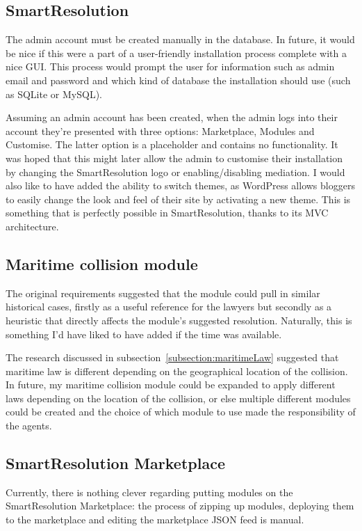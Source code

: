 \subsection{SmartResolution}

The admin account must be created manually in the database. In future, it would be nice if this were a part of a user-friendly installation process complete with a nice GUI. This process would prompt the user for information such as admin email and password and which kind of database the installation should use (such as SQLite or MySQL).

Assuming an admin account has been created, when the admin logs into their account they're presented with three options: Marketplace, Modules and Customise. The latter option is a placeholder and contains no functionality. It was hoped that this might later allow the admin to customise their installation by changing the SmartResolution logo or enabling/disabling mediation. I would also like to have added the ability to switch themes, as WordPress allows bloggers to easily change the look and feel of their site by activating a new theme. This is something that is perfectly possible in SmartResolution, thanks to its MVC architecture.

\subsection{Maritime collision module}

The original requirements suggested that the module could pull in similar historical cases, firstly as a useful reference for the lawyers but secondly as a heuristic that directly affects the module's suggested resolution. Naturally, this is something I'd have liked to have added if the time was available.

The research discussed in subsection~\ref{subsection:maritimeLaw} suggested that maritime law is different depending on the geographical location of the collision. In future, my maritime collision module could be expanded to apply different laws depending on the location of the collision, or else multiple different modules could be created and the choice of which module to use made the responsibility of the agents.

\subsection{SmartResolution Marketplace}

Currently, there is nothing clever regarding putting modules on the SmartResolution Marketplace: the process of zipping up modules, deploying them to the marketplace and editing the marketplace JSON feed is manual.


